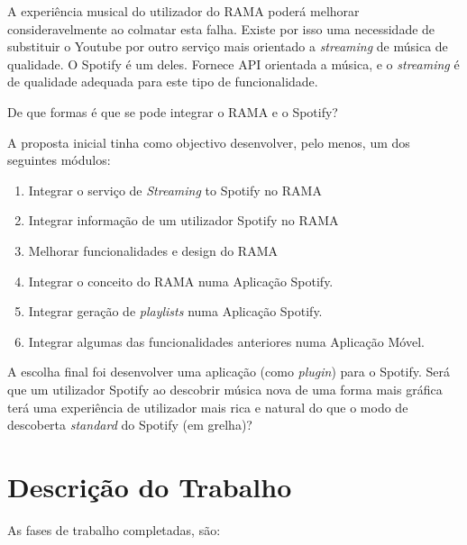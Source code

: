 \documentclass[twocolumn]{article}
\begin{document}
  A experiência musical do utilizador do RAMA poderá melhorar consideravelmente ao colmatar esta falha.
  Existe por isso uma necessidade de substituir o Youtube por outro serviço mais orientado a \emph{streaming} de música de qualidade.
  O Spotify é um deles. Fornece API orientada a música, e o \emph{streaming} é de qualidade adequada para este tipo de funcionalidade.

  De que formas é que se pode integrar o RAMA e o Spotify?

  A proposta inicial tinha como objectivo desenvolver, pelo menos, um dos seguintes módulos:

  \begin{enumerate}
    \item Integrar o serviço de \emph{Streaming} to Spotify no RAMA
    \item Integrar informação de um utilizador Spotify no RAMA
    \item Melhorar funcionalidades e design do RAMA
    \item Integrar o conceito do RAMA numa Aplicação Spotify.
    \item Integrar geração de \emph{playlists} numa Aplicação Spotify.
    \item Integrar algumas das funcionalidades anteriores numa Aplicação Móvel.
  \end{enumerate}

  A escolha final foi desenvolver uma aplicação (como \emph{plugin}) para o Spotify.
  Será que um utilizador Spotify ao descobrir música nova de uma forma mais gráfica terá uma experiência de utilizador mais rica e natural do que o modo de descoberta \emph{standard} do Spotify (em grelha)?

\section{Descrição do Trabalho}\label{sec:work}

  As fases de trabalho completadas, são:
\end{document}
